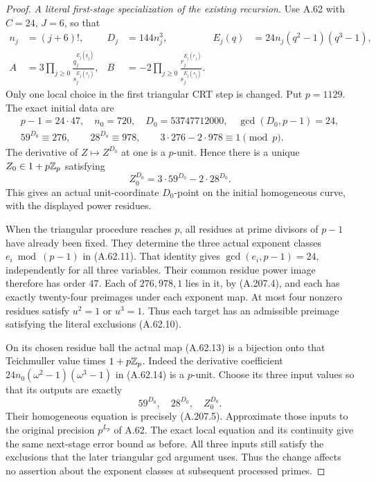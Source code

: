 \begin{proof}
\emph{A literal first-stage specialization of the existing recursion.}
Use A.62 with \(C=24\), \(J=6\), so that
\[
 \begin{aligned}
 n_j&=(j+6)!,&D_j&=144n_j^3,&
 E_j(q)&=24n_j(q^2-1)(q^3-1),\\
 A&=3\prod_{j\ge0}\frac{q_j^{E_j(q_j)}}{s_j^{E_j(s_j)}},&
 B&=-2\prod_{j\ge0}\frac{r_j^{E_j(r_j)}}{s_j^{E_j(s_j)}}.
 \end{aligned}
\tag{A.207.3}
\]
Only one local choice in the first triangular CRT step is
changed.  Put \(p=1129\).  The exact initial data are
\[
 \begin{gathered}
 p-1=24\cdot47,\quad n_0=720,\quad D_0=53747712000,
 \quad\gcd(D_0,p-1)=24,\\
 59^{D_0}\equiv276,\qquad28^{D_0}\equiv978,\qquad
                    3\cdot276-2\cdot978\equiv1\pmod p.
 \end{gathered}
\tag{A.207.4}
\]
The derivative of \(Z\mapsto Z^{D_0}\) at one is a
\(p\)-unit.  Hence there is a unique
\(Z_0\in1+p\mathbb Z_p\) satisfying
\[
             Z_0^{D_0}=3\cdot59^{D_0}-2\cdot28^{D_0}.
\tag{A.207.5}
\]
This gives an actual unit-coordinate \(D_0\)-point on the
initial homogeneous curve, with the displayed power residues.

When the triangular procedure reaches \(p\), all residues
at prime divisors of \(p-1\) have already been fixed.  They
determine the three actual exponent classes \(e_i\bmod(p-1)\)
in (A.62.11).  That identity gives
\(\gcd(e_i,p-1)=24\), independently for all three variables.
Their common residue power image therefore has order \(47\).
Each of \(276,978,1\) lies in it, by (A.207.4), and each
has exactly twenty-four preimages under each exponent map.
At most four nonzero residues satisfy \(u^2=1\) or \(u^3=1\).
Thus each target has an admissible preimage satisfying the
literal exclusions (A.62.10).

On its chosen residue ball the actual map (A.62.13) is a
bijection onto that Teichmuller value times \(1+p\mathbb Z_p\).
Indeed the derivative coefficient
\(24n_0(\omega^2-1)(\omega^3-1)\) in (A.62.14) is a
\(p\)-unit.  Choose its three input values so that its
outputs are exactly
\[
                  59^{D_0},\quad28^{D_0},\quad Z_0^{D_0}.
\tag{A.207.6}
\]
Their homogeneous equation is precisely (A.207.5).
Approximate those inputs to the original precision \(p^{L_p}\)
of A.62.  The exact local equation and its continuity give
the same next-stage error bound as before.  All three inputs
still satisfy the exclusions that the later triangular gcd
argument uses.  Thus the change affects no assertion about
the exponent classes at subsequent processed primes.


\end{proof}

